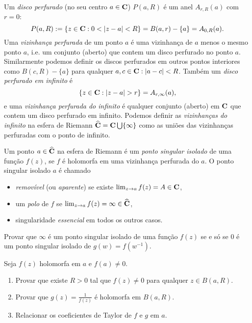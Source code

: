 \begin{defin}
Um \emph{disco perfurado} (no seu centro $a\in\mathbf{C}$)
$P(a,R)$ é um anel $A_{r,R}(a)$ com $r=0$:
\begin{equation}
\label{eq:perfurado}
P(a,R) := \{z\in\C: 0<|z-a|<R\} = B(a,r) -\{a\} = A_{0,R}(a).
\end{equation}
Uma \emph{vizinhança perfurada} de um ponto $a$ é uma vizinhança de $a$
menos o mesmo ponto $a$, i.e. um conjunto (aberto) que contem
um disco perfurado no ponto $a$.
Similarmente podemos definir os discos perfurados em outros pontos interiores
como $B(c,R) - \{a\}$ para qualquer $a,c\in \mathbf{C}: |a-c|<R$.
Também um \emph{disco perfurado em infinito} é 
\begin{equation}
\label{eq:perfurado}
\{z\in\C: |z-a|>r\} = A_{r,\infty}(a),
\end{equation}
e uma \emph{vizinhança perfurada do infinito} é qualquer conjunto (aberto) em $\mathbf{C}$
que contem um disco perfurado em infinito.
Podemos definir as \emph{vizinhanças do infinito} na esfera de Riemann
$\widehat{\mathbf{C}} = \mathbf{C} \bigcup \{\infty\}$ como as uniões
das vizinhanças perfuradas com o ponto de infinito.
\end{defin}

\begin{defin}
\label{d:isolado}
Um ponto $a\in\widehat{\mathbf{C}}$ na esfera de Riemann é um \emph{ponto singular isolado}
de uma função $f(z)$, se $f$ é holomorfa em uma
vizinhança perfurada do $a$. O ponto singular isolado $a$ é chamado
\begin{itemize}
\item \label{d:removivel} \emph{removível} (ou \emph{aparente})
se existe $\lim_{z\to a} f(z) = A \in \mathbf{C}$,
\item \label{d:polo} um \emph{polo} de $f$ se $\lim_{z\to a} f(z) = \infty \in \widehat{\mathbf{C}}$,
\item \label{d:essencial} singularidade \emph{essencial} em todos os outros casos.
\end{itemize}
\end{defin}

\begin{problema}
Provar que $\infty$ é um ponto singular isolado de uma função $f(z)$
se e só se $0$ é um ponto singular isolado de $g(w) = f(w^{-1})$.
\end{problema}

\begin{problema}
Seja $f(z)$ holomorfa em $a$ e $f(a)\neq 0$.
\begin{enumerate}
\item Provar que existe $R>0$
tal que $f(z)\neq 0$ para qualquer $z\in B(a,R)$.
\item Provar que $g(z) = \frac{1}{f(z)}$ é holomorfa em $B(a,R)$.
\item Relacionar os coeficientes de Taylor de $f$ e $g$ em $a$.
\end{enumerate}
\end{problema}


